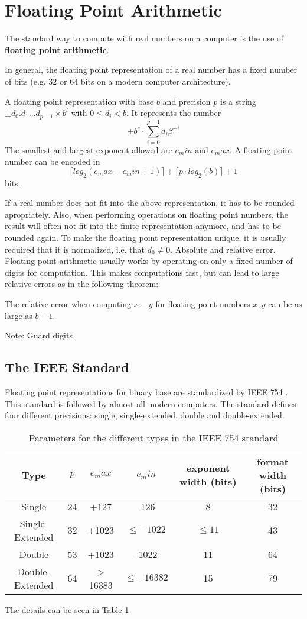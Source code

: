 \section{Floating Point Arithmetic}
The standard way to compute with real numbers on a computer is the use 
of \textbf{floating point arithmetic}. 

In general, the floating point representation of a real number has a fixed number of bits (e.g. 32 or 64 bits on a modern computer architecture).
\begin{definition}\label{def: floating point number}
	A floating point representation with base $b$ and precision $p$
	is a string $\pm d_0 . d_1 \dots d_{p-1} \times b^l$ with $0 \leq d_i < b$.	
	It represents the number
	$$ \pm b^e \cdot \sum_{i=0}^{p-1} d_i\beta^{-i} $$ 
	The smallest and largest exponent allowed are $e_min$ and $e_max$.
	A floating point number can be encoded in
	$$ \lceil log_2(e_max-e_min+1) \rceil + \lceil  p \cdot log_2 (b) \rceil + 1 $$
	bits.
\end{definition}
If a real number does not fit into the above representation, it has to be rounded apropriately.
Also, when performing operations on floating point numbers, the result will often not fit into the finite representation anymore, 
and has to be rounded again.
To make the floating point representation unique, it is usually required that it is normalized, i.e. that $d_0 \neq 0$.
Absolute and relative error.
Floating point arithmetic usually works by operating on only a fixed number of digits for computation.
This makes computations fast, but can lead to large relative errors as in the following theorem: 
\begin{theorem}
	The relative error when computing $x-y$ for floating point numbers $x,y$ can be as large as $b-1$. 
\end{theorem}
Note: Guard digits
\subsection{The IEEE Standard}
	Floating point representations for binary base are standardized by IEEE 754 \cite{ieee}. 
	This standard is followed by almost all modern computers.
	The standard defines four different precisions: single, single-extended, double and double-extended.
	  \begin{table}
	  	\centering
	    \begin{tabular}{ | c || c | c | c | c | c | }
	    \hline
	    Type & $p$ & $e_max$ & $e_min$ & exponent width (bits) & format width (bits) \\ \hline \hline
	    Single & 24 & +127 & -126 & 8 & 32 \\ \hline
	    Single-Extended & 32 & +1023 & $\leq -1022$ & $\leq 11$ & 43 \\ \hline
	    Double & 53 & +1023 & -1022 & 11 & 64 \\ \hline
	    Double-Extended & 64 & > 16383 & $\leq -16382$ & 15 & 79 \\ \hline
	    \end{tabular}
	    \caption{Parameters for the different types in the IEEE 754 standard}\label{table:IEEE floating point}
	  \end{table}
	  
	The details can be seen in Table \ref{table:IEEE floating point}

